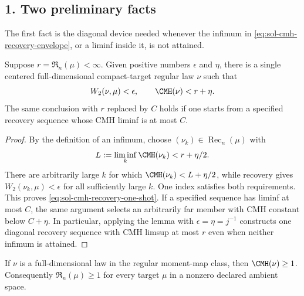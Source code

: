 \documentclass[../main.tex]{subfiles}
\begin{document}
\subsection*{1. Two preliminary facts}

The first fact is the diagonal device needed whenever the infimum in
\eqref{eq:sol-cmh-recovery-envelope}, or a liminf inside it, is not attained.

\begin{lemma}
\label{lem:sol-cmh-recovery-diagonal}
Suppose $r=\mathfrak R_n(\mu)<\infty$.  Given positive numbers $\epsilon$ and $\eta$, there is
a single centered full-dimensional compact-target regular law $\nu$ such that
\begin{equation}
  W_2(\nu,\mu)<\epsilon,
  \qquad
  \CMH(\nu)<r+\eta.
  \label{eq:sol-cmh-recovery-one-shot}
\end{equation}
The same conclusion with $r$ replaced by $C$ holds if one starts from a specified recovery
sequence whose CMH liminf is at most $C$.
\end{lemma}

\begin{proof}
By the definition of an infimum, choose $(\nu_k)\in\operatorname{Rec}_n(\mu)$ with
\[
  L:=\liminf_k\CMH(\nu_k)<r+\eta/2.
\]
There are arbitrarily large $k$ for which $\CMH(\nu_k)<L+\eta/2$, while recovery gives
$W_2(\nu_k,\mu)<\epsilon$ for all sufficiently large $k$.  One index satisfies both
requirements.  This proves \eqref{eq:sol-cmh-recovery-one-shot}.  If a specified sequence has
liminf at most $C$, the same argument selects an arbitrarily far member with CMH constant below
$C+\eta$.  In particular, applying the lemma with $\epsilon=\eta=j^{-1}$ constructs one
diagonal recovery sequence with CMH limsup at most $r$ even when neither infimum is attained.
\end{proof}

\begin{lemma}
\label{lem:sol-cmh-recovery-floor}
If $\nu$ is a full-dimensional law in the regular moment-map class, then
$\CMH(\nu)\ge1$.  Consequently $\mathfrak R_n(\mu)\ge1$ for every target $\mu$ in a nonzero
declared ambient space.
\end{lemma}
\end{document}
